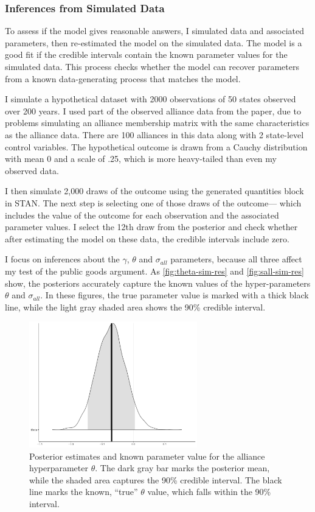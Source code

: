 \documentclass[12pt]{article}
\begin{document}
\subsubsection{Inferences from Simulated Data}


To assess if the model gives reasonable answers, I simulated data and associated parameters, then re-estimated the model on the simulated data.
The model is a good fit if the credible intervals contain the known parameter values for the simulated data. 
This process checks whether the model can recover parameters from a known data-generating process that matches the model. 


I simulate a hypothetical dataset with 2000 observations of 50 states observed over 200 years.
I used part of the observed alliance data from the paper, due to problems simulating an alliance membership matrix with the same characteristics as the alliance data. 
There are 100 alliances in this data along with 2 state-level control variables. 
The hypothetical outcome is drawn from a Cauchy distribution with mean 0 and a scale of .25, which is more heavy-tailed than even my observed data. 


I then simulate 2,000 draws of the outcome using the generated quantities block in STAN. 
The next step is selecting one of those draws of the outcome--- which includes the value of the outcome for each observation and the associated parameter values. 
I select the 12th draw from the posterior and check whether after estimating the model on these data, the credible intervals include zero. 


I focus on inferences about the $\gamma$, $\theta$ and $\sigma_{all}$ parameters, because all three affect my test of the public goods argument. 
As \autoref{fig:theta-sim-res} and \autoref{fig:sall-sim-res} show, the posteriors accurately capture the known values of the hyper-parameters $\theta$ and $\sigma_{all}$. 
In these figures, the true parameter value is marked with a thick black line, while the light gray shaded area shows the 90\% credible interval. 


\begin{figure}[htbp]
	\centering
		\includegraphics[width=0.65\textwidth]{theta-sim-res.pdf}
	\caption{Posterior estimates and known parameter value for the alliance hyperparameter $\theta$. The dark gray bar marks the posterior mean, while the shaded area captures the 90\% credible interval. The black line marks the known, ``true'' $\theta$ value, which falls within the 90\% interval.}
	\label{fig:theta-sim-res}
\end{figure}
\end{document}
